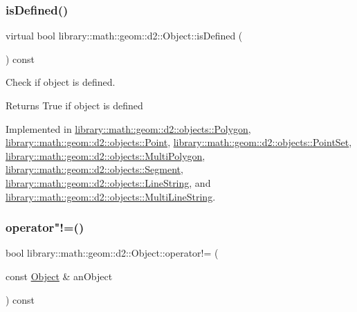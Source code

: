 \subsubsection{\texorpdfstring{is\+Defined()}{isDefined()}}
{\footnotesize\ttfamily virtual bool library\+::math\+::geom\+::d2\+::\+Object\+::is\+Defined (\begin{DoxyParamCaption}{ }\end{DoxyParamCaption}) const\hspace{0.3cm}{\ttfamily [pure virtual]}}



Check if object is defined. 

\begin{DoxyReturn}{Returns}
True if object is defined 
\end{DoxyReturn}


Implemented in \hyperlink{classlibrary_1_1math_1_1geom_1_1d2_1_1objects_1_1_polygon_a83e0962f91f0732048e156ad634faaea}{library\+::math\+::geom\+::d2\+::objects\+::\+Polygon}, \hyperlink{classlibrary_1_1math_1_1geom_1_1d2_1_1objects_1_1_point_ac90251968d8eb11df82e28f6cf095e5c}{library\+::math\+::geom\+::d2\+::objects\+::\+Point}, \hyperlink{classlibrary_1_1math_1_1geom_1_1d2_1_1objects_1_1_point_set_a031a6b5688c65bce8f37af452c0f0959}{library\+::math\+::geom\+::d2\+::objects\+::\+Point\+Set}, \hyperlink{classlibrary_1_1math_1_1geom_1_1d2_1_1objects_1_1_multi_polygon_a9afa806e12102255fc5abf8a94106089}{library\+::math\+::geom\+::d2\+::objects\+::\+Multi\+Polygon}, \hyperlink{classlibrary_1_1math_1_1geom_1_1d2_1_1objects_1_1_segment_a2c366d74328cdce4a7e83a761a84dbc7}{library\+::math\+::geom\+::d2\+::objects\+::\+Segment}, \hyperlink{classlibrary_1_1math_1_1geom_1_1d2_1_1objects_1_1_line_string_a2ef4a1e387ed463286fac7c93fd7b022}{library\+::math\+::geom\+::d2\+::objects\+::\+Line\+String}, and \hyperlink{classlibrary_1_1math_1_1geom_1_1d2_1_1objects_1_1_multi_line_string_a77de687b2c287226984e2614dafe744a}{library\+::math\+::geom\+::d2\+::objects\+::\+Multi\+Line\+String}.

\mbox{\label{classlibrary_1_1math_1_1geom_1_1d2_1_1_object_a538fa27124314cddf9705cf35a3efc08}} 
\subsubsection{\texorpdfstring{operator"!=()}{operator!=()}}
{\footnotesize\ttfamily bool library\+::math\+::geom\+::d2\+::\+Object\+::operator!= (\begin{DoxyParamCaption}\item[{const \hyperlink{classlibrary_1_1math_1_1geom_1_1d2_1_1_object}{Object} \&}]{an\+Object }\end{DoxyParamCaption}) const}



